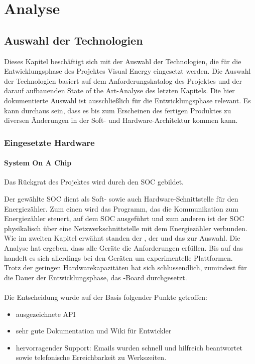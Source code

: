 \documentclass[Bachelorarbeit.tex]{subfiles}
\begin{document}
\chapter{Analyse}
\section{Auswahl der Technologien}
\label{sec:auswahl_technologien}
Dieses Kapitel beschäftigt sich mit der Auswahl der Technologien, die für die 
Entwicklungsphase des Projektes Visual Energy eingesetzt werden. Die Auswahl der 
Technologien basiert auf dem Anforderungskatalog des Projektes und der darauf 
aufbauenden State of the Art-Analyse des letzten Kapitels. Die hier dokumentierte 
Auswahl ist ausschließlich für die Entwicklungsphase relevant. Es kann durchaus sein, 
dass es bis zum Erscheinen des fertigen Produktes zu diversen Änderungen in der Soft- 
und Hardware-Architektur kommen kann.

\subsection{Eingesetzte Hardware}
\subsubsection*{System On A Chip}
Das Rückgrat des Projektes wird durch den \ac{SOC} gebildet. 
\begin{comment}
Der gewählte \ac{SOC} dient im Soft- sowie auch Hardware-Aspekt als Schnittstelle zum Energiezähler.
\end{comment}
Der gewählte \ac{SOC} dient als Soft- sowie auch Hardware-Schnittstelle für den Energiezähler. 
Zum einen wird das Programm, das die Kommunikation zum Energiezähler steuert, auf dem \ac{SOC} ausgeführt und zum anderen ist der \ac{SOC} physikalisch über eine Netzwerkschnittstelle mit
dem Energiezähler verbunden. 
Wie im zweiten Kapitel erwähnt standen der , der  und das  zur Auswahl. 
Die Analyse hat ergeben, dass alle Geräte die Anforderungen erfüllen. 
Bis auf das  handelt es sich allerdings bei den Geräten um experimentelle Plattformen. \\
Trotz der geringen Hardwarekapazitäten hat sich schlussendlich, zumindest für die Dauer der Entwicklungsphase, das -Board durchgesetzt. \\
\mbox{}\\
Die Entscheidung wurde auf der Basis folgender Punkte getroffen:
\begin{itemize}
\item ausgezeichnete API 
\item sehr gute Dokumentation und Wiki für Entwickler
\item hervorragender Support: Emails wurden schnell und hilfreich beantwortet sowie 
telefonische Erreichbarkeit zu Werkszeiten. 
\end{itemize}
\end{document}
